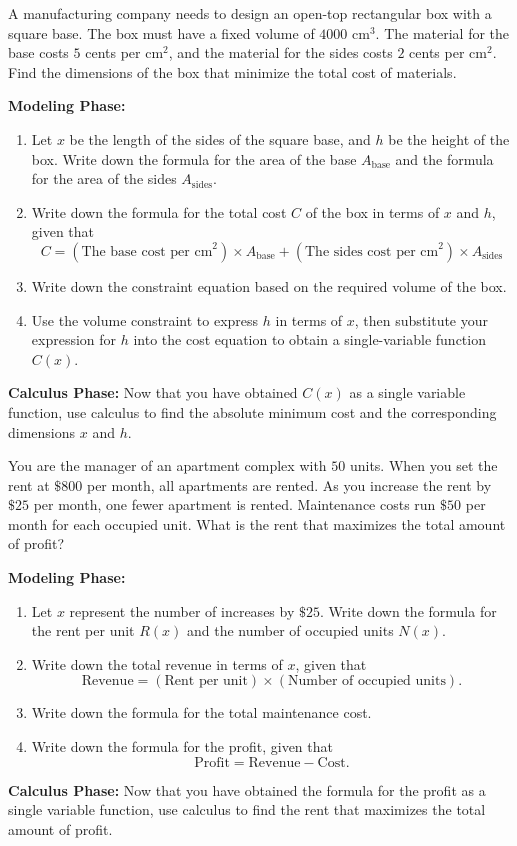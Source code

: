 \documentclass[10pt]{article}
\begin{document}
A manufacturing company needs to design an open-top rectangular box with a square base. The box must have a fixed volume of $4000 \text{ cm}^3$. The material for the base costs $5$ cents per $ \text{cm}^2$, and the material for the sides costs $2$ cents per $ \text{cm}^2$. Find the dimensions of the box that minimize the total cost of materials.

\vspace{2mm}
\textbf{Modeling Phase:}
\begin{enumerate}
    \item[(a)] Let $x$ be the length of the sides of the square base, and $h$ be the height of the box. Write down the formula for the area of the base $A_{\text{base}}$ and the formula for the area of the sides $A_{\text{sides}}$.
    
    \item[(b)] Write down the formula for the total cost $C$ of the box in terms of $x$ and $h$, given that
    $$
        C = (\text{The base cost per cm}^2) \times A_{\text{base}} + (\text{The sides cost per cm}^2) \times A_{\text{sides}}
    $$
    \item[(c)] Write down the constraint equation based on the required volume of the box.
    \item[(d)] Use the volume constraint to express $h$ in terms of $x$, then substitute your expression for $h$ into the cost equation to obtain a single-variable function $C(x)$.
\end{enumerate}

\vfill
\textbf{Calculus Phase:}
Now that you have obtained $C(x)$ as a single variable function, use calculus to find the absolute minimum cost and the corresponding dimensions $x$ and $h$.
\vfill
\newpage

You are the manager of an apartment complex with $50$ units. When you set the rent at $\$800$ per month, all apartments are rented. As you increase the rent by $\$25$ per month, one fewer apartment is rented. Maintenance costs run $\$50$ per month for each occupied unit. What is the rent that maximizes the total amount of profit?

\vspace{2mm}
\textbf{Modeling Phase:}
\begin{enumerate}
    \item[(a)] Let $x$ represent the number of increases by $\$25$. Write down the formula for the rent per unit $R(x)$ and the number of occupied units $N(x)$.
    \item[(b)] Write down the total revenue in terms of $x$, given that
    $$
        \text{Revenue} = (\text{Rent per unit}) \times (\text{Number of occupied units}).
    $$
    \item[(c)] Write down the formula for the total maintenance cost.
    \item[(d)] Write down the formula for the profit, given that
    $$
        \text{Profit} = \text{Revenue} - \text{Cost}.
    $$
\end{enumerate}
\vfill

\textbf{Calculus Phase:}
Now that you have obtained the formula for the profit as a single variable function, use calculus to find the rent that maximizes the total amount of profit.
\vfill
\end{document}

